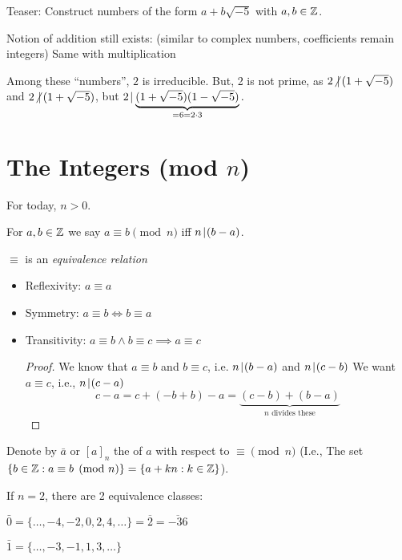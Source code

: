 \documentclass[notes.tex]{subfiles}
\begin{document}

Teaser: Construct numbers of the form $a+b\sqrt{-5}$ with $a, b\in\mathbb{Z}$.

Notion of addition still exists: (similar to complex numbers, coefficients remain integers)
Same with multiplication

Among these ``numbers'', $2$ is irreducible. But, 2 is not prime, as $2\mkern1mu{\not{|}}\mkern3mu (1+\sqrt{-5})$ and $2\mkern1mu{\not{|}}\mkern3mu(1+\sqrt{-5})$, but $2\mkern2mu|\mkern1mu \underbrace{(1+\sqrt{-5})(1-\sqrt{-5})}_{=6 = 2\cdot 3}.$


\chapter*{The Integers (mod $n$)}

For today, $n>0$.

\begin{definition}
	For $a, b\in\mathbb{Z}$ we say $a\equiv b \pmod n$ iff $n\mkern2mu|\mkern1mu(b-a)$.
\end{definition}

$\equiv$ is an \emph{equivalence relation}

\begin{itemize}
	\item Reflexivity: $a\equiv a$
	\item Symmetry: $a\equiv b \iff b\equiv a$
	\item Transitivity: $a\equiv b \land b\equiv c \implies a \equiv c$
	\begin{proof}
	We know that $a\equiv b$ and $b\equiv c$, i.e. $n\mkern2mu|\mkern1mu (b-a)$ and $n\mkern2mu|\mkern1mu (c-b)$
	We want $a\equiv c$, i.e., $n\mkern2mu|\mkern1mu(c-a)$
	\[
		c-a = c+ (-b + b) - a = \underbrace{(c-b) + (b-a)}_{n\text{  divides these}}
	\]
	\end{proof}
\end{itemize}

\begin{definition}
	Denote by $\bar a$ or $[a]_n$ the  of $a$ with respect to $\equiv\pmod n$
	(I.e., The set $\{b\in\mathbb{Z}:a\equiv b\pmod n\} = \{a+kn:k\in\mathbb{Z}\}$).
\end{definition}

\begin{eg}
	If $n=2$, there are 2 equivalence classes:

	$\bar 0 = \{\ldots, -4, -2, 0, 2, 4, \ldots \} = \overline{2} = \overline{-36}$

	$\bar 1 = \{\ldots, -3, -1, 1, 3, \ldots\}$
\end{eg}
\end{document}
